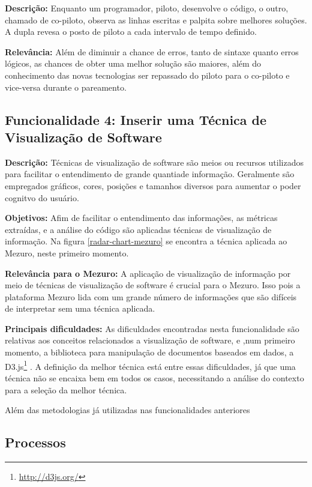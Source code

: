 \textbf{Descrição:} Enquanto um programador, piloto, desenvolve o código, o outro, chamado de co-piloto, observa as linhas escritas e palpita sobre melhores soluções. A dupla revesa o posto de piloto a cada intervalo de tempo definido. 

\textbf{Relevância:} Além de diminuir a chance de erros, tanto de sintaxe quanto erros lógicos, as chances de obter uma melhor solução são maiores, além do conhecimento das novas tecnologias ser repassado do piloto para o co-piloto e vice-versa durante o pareamento.

\subsection{Funcionalidade 4: Inserir uma Técnica de Visualização de Software}
\label{functionality-4}

\textbf{Descrição:}  Técnicas de visualização de software são meios ou recursos utilizados para facilitar o entendimento de grande quantiade informação. Geralmente são empregados gráficos, cores, posições e tamanhos diversos para aumentar o poder cognitvo do usuário.

\textbf{Objetivos:} Afim de facilitar o entendimento das informações, as métricas extraídas, e a análise do código são aplicadas técnicas de visualização de informação. Na figura \ref{radar-chart-mezuro} se encontra a técnica aplicada ao Mezuro, neste primeiro momento.

\textbf{Relevância para o Mezuro:} A aplicação de visualização de informação por meio de técnicas de visualização de software é crucial para o Mezuro. Isso pois a plataforma Mezuro lida com um grande número de informações que são difíceis de interpretar sem uma técnica aplicada.

\textbf{Principais dificuldades:} As dificuldades encontradas nesta funcionalidade são relativas aos conceitos relacionados a visualização de software, e ,num primeiro momento, a biblioteca para manipulação de documentos baseados em dados, a D3.js\footnote{\url{http://d3js.org/}} . A definição da melhor técnica está entre essas dificuldades, já que uma técnica não se encaixa bem em todos os casos, necessitando a análise do contexto para a seleção da melhor técnica.

Além das metodologias já utilizadas nas funcionalidades anteriores

\subsection{Processos}

